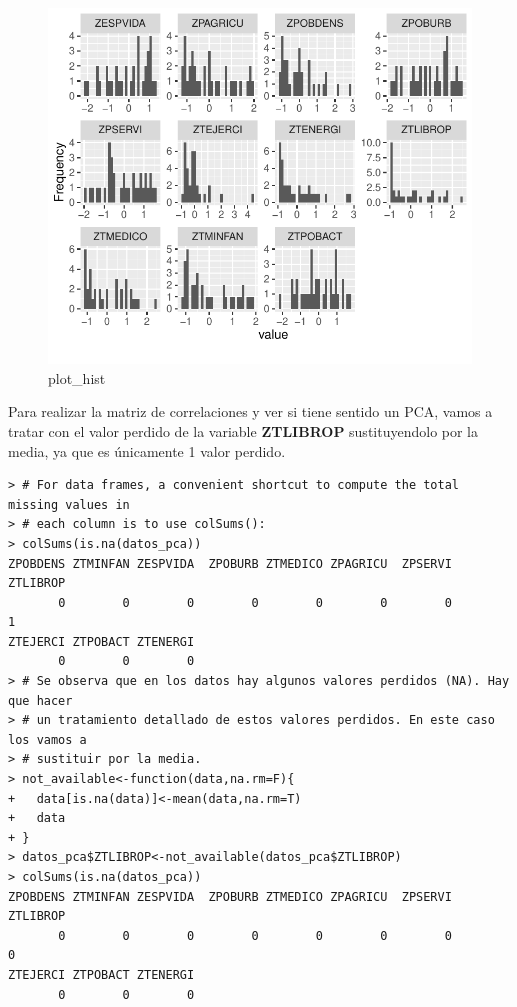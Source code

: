 \documentclass[12pt,twoside]{report}
\begin{document}
\begin{figure}[H]
\includegraphics[width=\textwidth]{../code/figures/plot_histogram.pdf}
\caption{plot\_hist}
\label{fig:plot_hist}
\end{figure} 

\normalsize Para realizar la matriz de correlaciones y ver si tiene sentido un PCA, vamos a tratar con el valor perdido de la variable \textbf{ZTLIBROP} sustituyendolo por la media, ya que es únicamente 1 valor perdido.

\footnotesize \begin{verbatim}
> # For data frames, a convenient shortcut to compute the total missing values in
> # each column is to use colSums():
> colSums(is.na(datos_pca))
ZPOBDENS ZTMINFAN ZESPVIDA  ZPOBURB ZTMEDICO ZPAGRICU  ZPSERVI ZTLIBROP 
       0        0        0        0        0        0        0        1
ZTEJERCI ZTPOBACT ZTENERGI 
       0        0        0 
> # Se observa que en los datos hay algunos valores perdidos (NA). Hay que hacer 
> # un tratamiento detallado de estos valores perdidos. En este caso los vamos a
> # sustituir por la media.
> not_available<-function(data,na.rm=F){
+   data[is.na(data)]<-mean(data,na.rm=T)
+   data
+ }
> datos_pca$ZTLIBROP<-not_available(datos_pca$ZTLIBROP)
> colSums(is.na(datos_pca))
ZPOBDENS ZTMINFAN ZESPVIDA  ZPOBURB ZTMEDICO ZPAGRICU  ZPSERVI ZTLIBROP 
       0        0        0        0        0        0        0        0 
ZTEJERCI ZTPOBACT ZTENERGI 
       0        0        0 
\end{verbatim}
\normalsize
\end{document}
